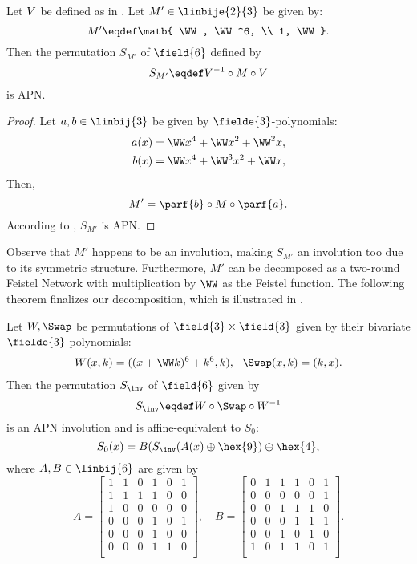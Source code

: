 \begin{proposition}
Let $V$ be defined as in . Let $M' \in \linbije{2}{3}$ be given by:
$$
M' \eqdef \matb{
\WW, \WW^6, \\
1, \WW
}.
$$
Then the permutation $S_{M'}$ of $\field{6}$ defined by
$$
S_{M'} \eqdef \TI^{-1} \circ M \circ \TI
$$
is APN.
\end{proposition}
\begin{proof}
Let $a,b\in \linbij{3}$ be given by $\fielde{3}$-polynomials:
\begin{align*}
    a(x) &= \WW x^4 + \WW x^2 + \WW^2 x,\\
    b(x) &= \WW x^4 + \WW^3 x^2 + \WW x,\\
\end{align*}
Then, 
$$
M' = \parf{b} \circ M \circ \parf{a}.
$$
According to , $S_{M'}$ is APN.
\end{proof}

Observe that $M'$ happens to be an involution, making $S_{M'}$ an involution too due to its symmetric structure. Furthermore, $M'$ can be decomposed as a two-round Feistel Network with multiplication by $\WW$ as the Feistel function. The following theorem finalizes our decomposition, which is illustrated in .

\newcommand\TJ{W}
\begin{theorem}[Decomposition of $S_0$]
Let $\TJ,\Swap$ be permutations of $\field{3}\times\field{3}$ given by their bivariate $\fielde{3}$-polynomials:
\begin{align*}
    \TJ(x,k) = ((x + \WW k)^6 + k^6, k),~~ \Swap(x,k) = (k, x).
\end{align*}
Then the permutation $S_{\inv}$ of $\field{6}$ given by
$$
S_{\inv} \eqdef \TJ \circ \Swap \circ \TJ^{-1}
$$
is an APN involution and is affine-equivalent to $S_0$:
$$
S_0(x) = B(S_{\inv}(A(x) \oplus \hex{9}) \oplus \hex{4},
$$
where $A,B \in \linbij{6}$ are given by
$$
A = 
\begin{bmatrix}
1 & 1 & 0 & 1 & 0 & 1 \\
1 & 1 & 1 & 1 & 0 & 0 \\
1 & 0 & 0 & 0 & 0 & 0 \\
0 & 0 & 0 & 1 & 0 & 1 \\
0 & 0 & 0 & 1 & 0 & 0 \\
0 & 0 & 0 & 1 & 1 & 0 \\
\end{bmatrix},
\hspace{1em}
B = 
\begin{bmatrix}
0 & 1 & 1 & 1 & 0 & 1 \\
0 & 0 & 0 & 0 & 0 & 1 \\
0 & 0 & 1 & 1 & 1 & 0 \\
0 & 0 & 0 & 1 & 1 & 1 \\
0 & 0 & 1 & 0 & 1 & 0 \\
1 & 0 & 1 & 1 & 0 & 1 \\
\end{bmatrix}.
$$
\end{theorem}

